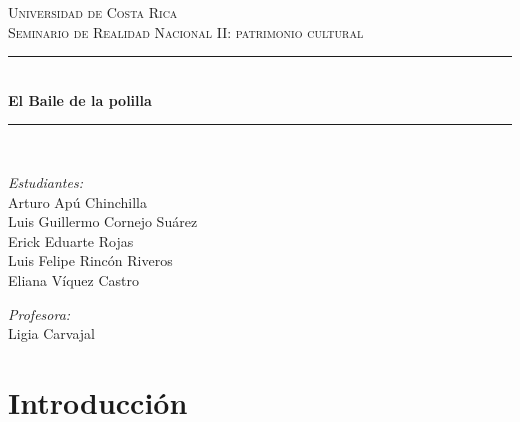 \documentclass[11pt, letterpaper, oneside]{report}
\newcommand{\HRule}{\rule{\linewidth}{0.5mm}}
\begin{document}
\begin{titlepage}
\begin{center}

\Large \textsc{Universidad de Costa Rica}\\[0.4cm]

\normalsize \textsc{Seminario de Realidad Nacional II: patrimonio cultural}\\[2cm]

\HRule \\[0.2cm]
{ \Huge \bfseries El Baile de la polilla \\[0.2cm] }

\HRule \\[3.5cm]

\begin{minipage}{0.5\textwidth}
\begin{flushleft} \large
\emph{Estudiantes:}\\ [0.2cm]
Arturo Apú Chinchilla \\
Luis Guillermo Cornejo Suárez \\
Erick Eduarte Rojas \\
Luis Felipe Rincón Riveros \\
Eliana Víquez Castro \\
\end{flushleft}
\end{minipage}
\begin{minipage}{0.4\textwidth}
\begin{flushright} \large
\emph{Profesora:} \\
Ligia Carvajal
\end{flushright}
\end{minipage}

\vfill

{\large {}}

\end{center}
\end{titlepage}

\section{Introducción}
\end{document}
